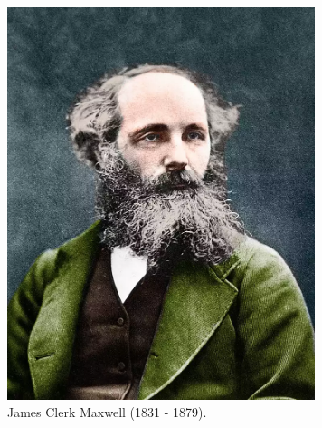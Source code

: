 \begin{figure}[h]
    \centering
       \includegraphics[width=9cm]{archivos/maxwell}
        \caption{James Clerk Maxwell (1831 - 1879). \cite{StodartCirca.1890} }
        \label{fig:maxwell}
\end{figure}

